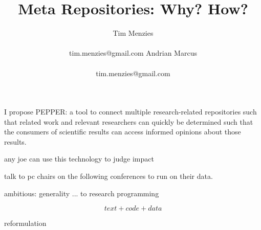 \documentclass[journal]{IEEEtran}
\begin{document}
 
\title{Meta Repositories: Why? How?}%
\author{\alignauthor  Tim Menzies \\
       \\
        tim.menzies@gmail.com
\alignauthor Andrian Marcus\\
       \\
        tim.menzies@gmail.com}
 
\maketitle
  
%
%
%
%
%
%

 
I propose PEPPER: a tool to connect multiple research-related repositories
such that related work and  relevant researchers can quickly be determined such 
that the  consumers of scientific results can access informed opinions
about those results. 

any joe can use this technology to judge impact

talk to pc chairs on the following conferences to run on their data.

ambitious: generality ... to research programming

\[text + code + data\]

reformulation
\end{document}
